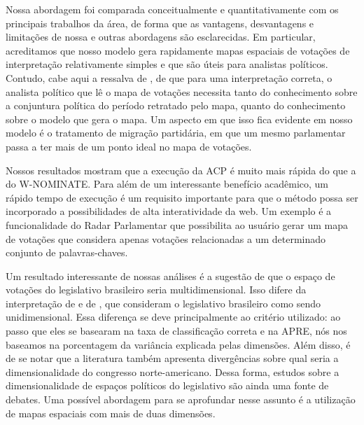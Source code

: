 \documentclass[
	article,			%
	12pt,				%
    twoside,			%
	a4paper,			%
	english,			%
	french,				%
	spanish,			%
	brazil,				%
	]{abntex2}
\newcommand\wnominate{W-NOMINATE\xspace}
\begin{document}
Nossa abordagem foi comparada conceitualmente e quantitativamente com os principais trabalhos da área, de forma que as vantagens, desvantagens e limitações de nossa e outras abordagens são esclarecidas. Em particular, acreditamos que nosso modelo gera rapidamente mapas espaciais de votações de interpretação relativamente simples e que são úteis para analistas políticos.
%
Contudo, cabe aqui a ressalva de , de que para uma interpretação correta, o analista político que lê o mapa de votações necessita tanto do conhecimento sobre a conjuntura política do período retratado pelo mapa, quanto do conhecimento sobre o modelo que gera o mapa. Um aspecto em que isso fica evidente em nosso modelo é o tratamento de migração partidária, em que um mesmo parlamentar passa a ter mais de um ponto ideal no mapa de votações.

Nossos resultados mostram que a execução da ACP é muito mais rápida do que a do \wnominate. Para além de um interessante benefício acadêmico, um rápido tempo de execução é um requisito importante para que o método possa ser incorporado a possibilidades de alta interatividade da web. Um exemplo é a funcionalidade do Radar Parlamentar que possibilita ao usuário gerar um mapa de votações que considera apenas votações relacionadas a um determinado conjunto de palavras-chaves.

Um resultado interessante de nossas análises é a sugestão de que o espaço de votações do legislativo brasileiro seria multidimensional. Isso difere da interpretação de  e de , que consideram o legislativo brasileiro como sendo unidimensional. Essa diferença se deve principalmente ao critério utilizado: ao passo que eles se basearam na taxa de classificação correta e na APRE, nós nos baseamos na porcentagem da variância explicada pelas dimensões.
Além disso, é de se notar que a literatura também apresenta divergências sobre qual seria a dimensionalidade do congresso norte-americano. 
%
Dessa forma, estudos sobre a dimensionalidade de espaços políticos do legislativo são ainda uma fonte de debates. Uma possível abordagem para se aprofundar nesse assunto é a utilização de mapas espaciais com mais de duas dimensões.
\end{document}
